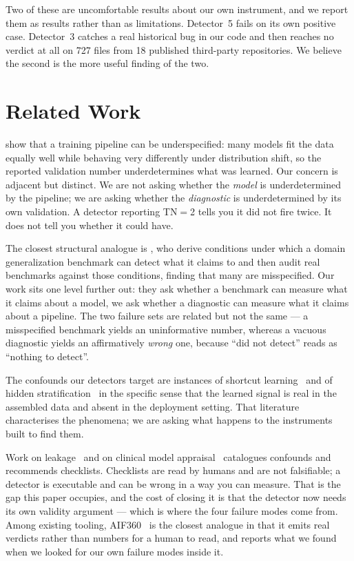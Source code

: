 \documentclass[pmlr,twocolumn,10pt]{jmlr}
\begin{document}
Two of these are uncomfortable results about our own instrument, and we report
them as results rather than as limitations. Detector~5 fails on its own positive
case. Detector~3 catches a real historical bug in our code and then reaches no
verdict at all on 727 files from 18 published third-party repositories. We
believe the second is the more useful finding of the two.

\section{Related Work}
\label{sec:related}

\citet{damour2022underspecification} show that a training pipeline can be
underspecified: many models fit the data equally well while behaving very
differently under distribution shift, so the reported validation number
underdetermines what was learned. Our concern is adjacent but distinct. We are
not asking whether the \emph{model} is underdetermined by the pipeline; we are
asking whether the \emph{diagnostic} is underdetermined by its own validation.
A detector reporting TN$=$2 tells you it did not fire twice. It does not tell
you whether it could have.

The closest structural analogue is
\citet{salaudeen2025misspecified}, who derive conditions under which a domain
generalization benchmark can detect what it claims to and then audit real
benchmarks against those conditions, finding that many are misspecified. Our
work sits one level further out: they ask whether a benchmark can measure what
it claims about a model, we ask whether a diagnostic can measure what it claims
about a pipeline. The two failure sets are related but not the same --- a
misspecified benchmark yields an uninformative number, whereas a vacuous
diagnostic yields an affirmatively \emph{wrong} one, because ``did not detect''
reads as ``nothing to detect''.

The confounds our detectors target are instances of shortcut
learning~\citep{geirhos2020shortcut} and of hidden
stratification~\citep{oakdenrayner2020hidden} in the specific sense that the
learned signal is real in the assembled data and absent in the deployment
setting. That literature characterises the phenomena; we are asking what happens
to the instruments built to find them.

Work on leakage~\citep{kapoor2023leakage} and on clinical model
appraisal~\citep{wynants2020prediction,roberts2021common} catalogues confounds
and recommends checklists. Checklists are read by humans and are not
falsifiable; a detector is executable and can be wrong in a way you can measure.
That is the gap this paper occupies, and the cost of closing it is that the
detector now needs its own validity argument --- which is where the four failure
modes come from. Among existing tooling, AIF360~\citep{bellamy2019aif360} is the
closest analogue in that it emits real verdicts rather than numbers for a human
to read, and  reports what we found when we looked
for our own failure modes inside it.
\end{document}
